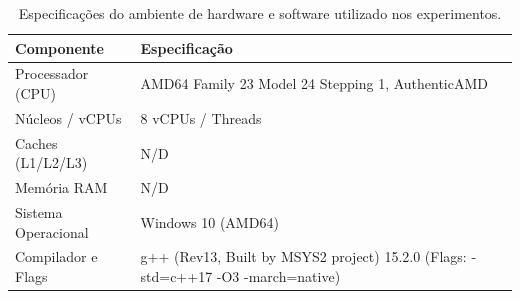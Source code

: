 \begin{table}[htbp]
\centering
\caption{Especificações do ambiente de hardware e software utilizado nos experimentos.}
\label{tab:ambiente_experimental}
\begin{tabular}{ll}
\hline
\textbf{Componente} & \textbf{Especificação} \\
\hline
Processador (CPU) & AMD64 Family 23 Model 24 Stepping 1, AuthenticAMD \\
Núcleos / vCPUs & 8 vCPUs / Threads \\
Caches (L1/L2/L3) & N/D \\
Memória RAM & N/D \\
Sistema Operacional & Windows 10 (AMD64) \\
Compilador e Flags & g++ (Rev13, Built by MSYS2 project) 15.2.0 (Flags: -std=c++17 -O3 -march=native) \\
\hline
\end{tabular}
\end{table}

